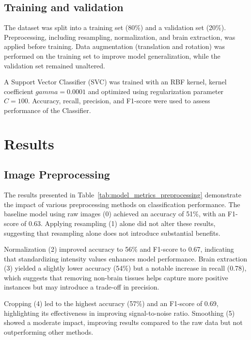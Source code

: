 %
\subsection{Training and validation}

The dataset was split into a training set (80\%) and a validation set (20\%). Preprocessing, including resampling, normalization, and brain extraction, was applied before training. Data augmentation (translation and rotation) was performed on the training set to improve model generalization, while the validation set remained unaltered.

A Support Vector Classifier (SVC) was trained with an RBF kernel, kernel coefficient \mbox{$gamma=0.0001$} and optimized using regularization parameter \mbox{$C=100$}. Accuracy, recall, precision, and F1-score were used to assess performance of the Classifier.

\section{Results}

\subsection{Image Preprocessing}

The results presented in Table~\ref{tab:model_metrics_preprocessing} demonstrate the impact of various preprocessing methods on classification performance. The baseline model using raw images (0) achieved an accuracy of 51\%, with an F1-score of 0.63. Applying resampling (1) alone did not alter these results, suggesting that resampling alone does not introduce substantial benefits.

Normalization (2) improved accuracy to 56\% and F1-score to 0.67, indicating that standardizing intensity values enhances model performance. Brain extraction (3) yielded a slightly lower accuracy (54\%) but a notable increase in recall (0.78), which suggests that removing non-brain tissues helps capture more positive instances but may introduce a trade-off in precision.

Cropping (4) led to the highest accuracy (57\%) and an F1-score of 0.69, highlighting its effectiveness in improving signal-to-noise ratio. Smoothing (5) showed a moderate impact, improving results compared to the raw data but not outperforming other methods.

